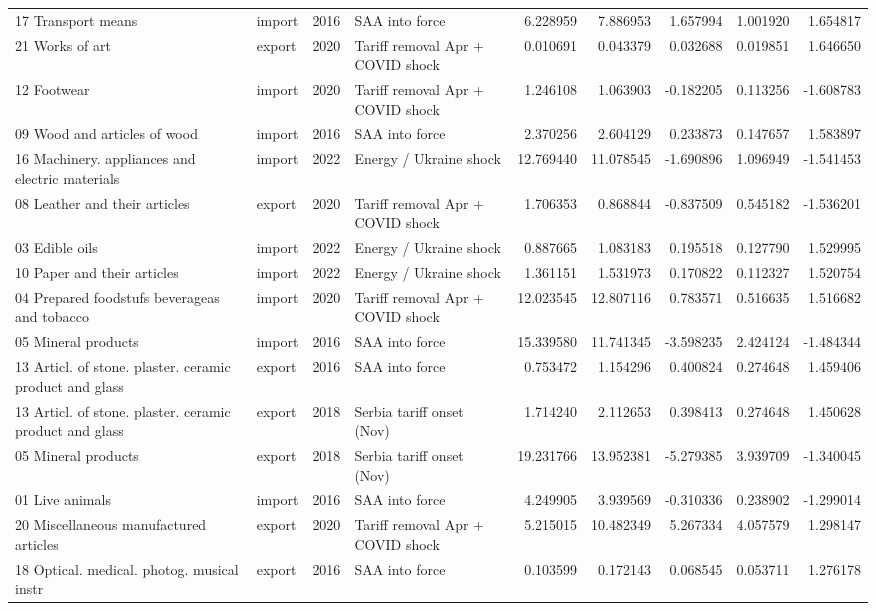 \begin{tabular}{llrlrrrrr}
17 Transport means & import & 2016 & SAA into force & 6.228959 & 7.886953 & 1.657994 & 1.001920 & 1.654817 \\
21 Works of art & export & 2020 & Tariff removal Apr + COVID shock & 0.010691 & 0.043379 & 0.032688 & 0.019851 & 1.646650 \\
12 Footwear & import & 2020 & Tariff removal Apr + COVID shock & 1.246108 & 1.063903 & -0.182205 & 0.113256 & -1.608783 \\
09 Wood and articles of wood & import & 2016 & SAA into force & 2.370256 & 2.604129 & 0.233873 & 0.147657 & 1.583897 \\
16 Machinery. appliances and electric materials & import & 2022 & Energy / Ukraine shock & 12.769440 & 11.078545 & -1.690896 & 1.096949 & -1.541453 \\
08 Leather and their articles & export & 2020 & Tariff removal Apr + COVID shock & 1.706353 & 0.868844 & -0.837509 & 0.545182 & -1.536201 \\
03 Edible oils & import & 2022 & Energy / Ukraine shock & 0.887665 & 1.083183 & 0.195518 & 0.127790 & 1.529995 \\
10 Paper and their articles & import & 2022 & Energy / Ukraine shock & 1.361151 & 1.531973 & 0.170822 & 0.112327 & 1.520754 \\
04 Prepared foodstufs beverageas and tobacco & import & 2020 & Tariff removal Apr + COVID shock & 12.023545 & 12.807116 & 0.783571 & 0.516635 & 1.516682 \\
05 Mineral products & import & 2016 & SAA into force & 15.339580 & 11.741345 & -3.598235 & 2.424124 & -1.484344 \\
13 Articl. of stone. plaster. ceramic product and glass & export & 2016 & SAA into force & 0.753472 & 1.154296 & 0.400824 & 0.274648 & 1.459406 \\
13 Articl. of stone. plaster. ceramic product and glass & export & 2018 & Serbia tariff onset (Nov) & 1.714240 & 2.112653 & 0.398413 & 0.274648 & 1.450628 \\
05 Mineral products & export & 2018 & Serbia tariff onset (Nov) & 19.231766 & 13.952381 & -5.279385 & 3.939709 & -1.340045 \\
01 Live animals & import & 2016 & SAA into force & 4.249905 & 3.939569 & -0.310336 & 0.238902 & -1.299014 \\
20 Miscellaneous manufactured articles & export & 2020 & Tariff removal Apr + COVID shock & 5.215015 & 10.482349 & 5.267334 & 4.057579 & 1.298147 \\
18 Optical. medical. photog. musical instr & export & 2016 & SAA into force & 0.103599 & 0.172143 & 0.068545 & 0.053711 & 1.276178 \\

\end{tabular}
